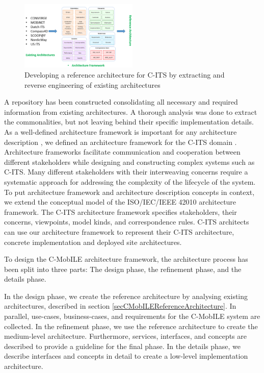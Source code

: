 \documentclass[conference]{IEEEtran}
\begin{document}
\begin{figure}[ht!]
	\centering
	\includegraphics[width=0.5\textwidth]{methodology}
	\caption{Developing a reference architecture for C-ITS by extracting and reverse engineering of existing architectures}
	\label{methodology}
	\centering
	
\end{figure}

A repository has been constructed consolidating all necessary and required information from existing architectures.
A thorough analysis was done to extract the commonalities, but not leaving behind their specific implementation details.
As a well-defined architecture framework is important for any architecture description \cite{archframework}, we defined an architecture framework for the C-ITS domain \cite{ITSCongress}.
Architecture frameworks facilitate communication and cooperation between different stakeholders while designing and constructing complex systems such as C-ITS.
Many different stakeholders with their interweaving concerns require a systematic approach for addressing the complexity of the lifecycle of the system.
To put architecture framework and architecture description concepts in context, we extend the conceptual model of the ISO/IEC/IEEE 42010\cite{iso42010} architecture framework.
The C-ITS architecture framework specifies stakeholders, their concerns, viewpoints, model kinds, and correspondence rules.
C-ITS architects can use our architecture framework to represent their C-ITS architecture, concrete implementation and deployed site architectures.

To design the C-MobILE architecture framework, the architecture process has been split into three parts:
The design phase, the refinement phase, and the details phase.

In the design phase, we create the reference architecture by analysing existing architectures, described in section \ref{secCMobILEReferenceArchitecture}.
In parallel, use-cases, business-cases, and requirements for the C-MobILE system are collected.
In the refinement phase, we use the reference architecture to create the medium-level architecture.
Furthermore, services, interfaces, and concepts are described to provide a guideline for the final phase.
In the details phase, we describe interfaces and concepts in detail to create a low-level implementation architecture.
\end{document}
